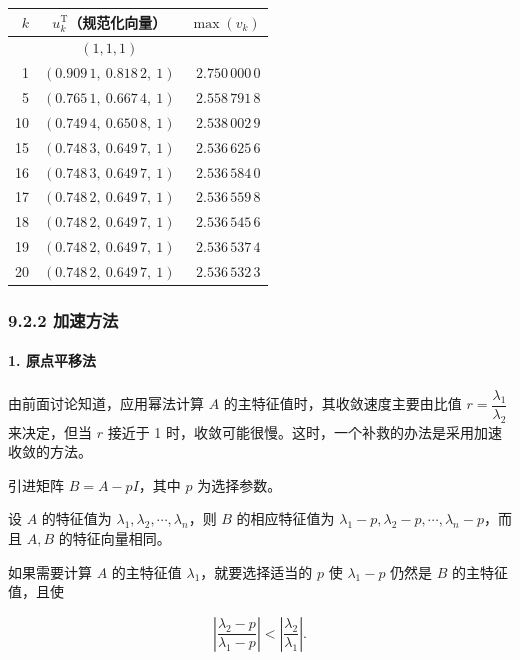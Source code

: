 \documentclass[
  10pt,
  fontset=fandol]{ctexart}
\newcounter{none} %
\begin{document}
{\def\LTcaptype{none} %
\begin{longtable}[]{@{}rcr@{}}
\toprule\noalign{}
\(k\) & \(u_k^{\mathrm T}\)（规范化向量） & \(\max(v_k)\) \\
\midrule\noalign{}
\endhead
\bottomrule\noalign{}
\endlastfoot
0 & \((1,1,1)\) & \\
1 & \((0.909\,1,\ 0.818\,2,\ 1)\) & \(2.750\,000\,0\) \\
5 & \((0.765\,1,\ 0.667\,4,\ 1)\) & \(2.558\,791\,8\) \\
10 & \((0.749\,4,\ 0.650\,8,\ 1)\) & \(2.538\,002\,9\) \\
15 & \((0.748\,3,\ 0.649\,7,\ 1)\) & \(2.536\,625\,6\) \\
16 & \((0.748\,3,\ 0.649\,7,\ 1)\) & \(2.536\,584\,0\) \\
17 & \((0.748\,2,\ 0.649\,7,\ 1)\) & \(2.536\,559\,8\) \\
18 & \((0.748\,2,\ 0.649\,7,\ 1)\) & \(2.536\,545\,6\) \\
19 & \((0.748\,2,\ 0.649\,7,\ 1)\) & \(2.536\,537\,4\) \\
20 & \((0.748\,2,\ 0.649\,7,\ 1)\) & \(2.536\,532\,3\) \\
\end{longtable}
}

\subsubsection{9.2.2 加速方法}\label{ux52a0ux901fux65b9ux6cd5}

\paragraph{1. 原点平移法}\label{ux539fux70b9ux5e73ux79fbux6cd5}

由前面讨论知道，应用幂法计算 \(A\) 的主特征值时，其收敛速度主要由比值 \(r=\dfrac{\lambda_1}{\lambda_2}\) 来决定，但当 \(r\) 接近于 1 时，收敛可能很慢。这时，一个补救的办法是采用加速收敛的方法。

引进矩阵 \(B=A-pI\)，其中 \(p\) 为选择参数。

设 \(A\) 的特征值为 \(\lambda_1,\lambda_2,\cdots,\lambda_n\)，则 \(B\) 的相应特征值为 \(\lambda_1-p,\lambda_2-p,\cdots,\lambda_n-p\)，而且 \(A,B\) 的特征向量相同。

如果需要计算 \(A\) 的主特征值 \(\lambda_1\)，就要选择适当的 \(p\) 使 \(\lambda_1-p\) 仍然是 \(B\) 的主特征值，且使

\[
\left|\frac{\lambda_2-p}{\lambda_1-p}\right|<\left|\frac{\lambda_2}{\lambda_1}\right|.
\]
\end{document}

